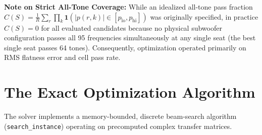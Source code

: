 \documentclass[11pt,a4paper]{article}
\begin{document}
\noindent \textbf{Note on Strict All-Tone Coverage:} While an idealized all-tone pass fraction $C(S) = \frac{1}{R} \sum_r \prod_k \mathbf{1}(|p(r, k)| \in [p_{\text{lo}}, p_{\text{hi}}])$ was originally specified, in practice $C(S) = 0$ for all evaluated candidates because no physical subwoofer configuration passes all 95 frequencies simultaneously at any single seat (the best single seat passes 64 tones). Consequently, optimization operated primarily on RMS flatness error and cell pass rate.

\section{The Exact Optimization Algorithm}

The solver implements a memory-bounded, discrete beam-search algorithm (\texttt{search\_instance}) operating on precomputed complex transfer matrices.
\end{document}

